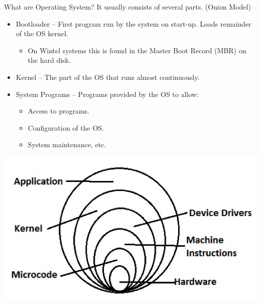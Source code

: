 \documentclass[12pt,a4paper]{article}
\theoremstyle{definition}
\newenvironment{myitemize}
{ \begin{itemize}
    \setlength{\itemsep}{5pt}
    \setlength{\parskip}{0pt}
    \setlength{\parsep}{0pt}     }
{ \end{itemize}                  }
\begin{document}
\begin{tcolorbox}
	\textsf{What are Operating System?} It usually consists of several parts. (\textsf{Onion Model})
	
	\begin{myitemize}
		\item Bootloader – First program run by the system on start-up. Loads remainder of the OS kernel. 
		\begin{myitemize}
			\item On Wintel systems this is found in the Master Boot Record (MBR) on the hard disk.
		\end{myitemize}
		\item Kernel – The part of the OS that runs almost continuously. 
		\item System Programs – Programs provided by the OS to allow:
		\begin{myitemize}
		\item Access to programs.
		\item Configuration of the OS.
		\item System maintenance, etc.
		\end{myitemize}
	\end{myitemize}
		\includegraphics[scale=0.5]{m1/onionModel}
		\centering
\end{tcolorbox}
\end{document}
